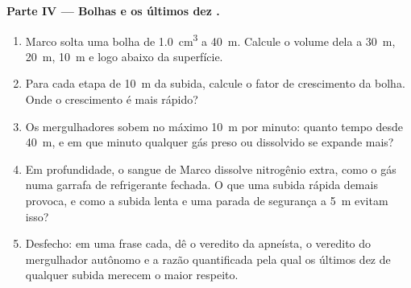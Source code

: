 \begin{problem}
\medskip
\noindent\textbf{Parte IV --- Bolhas e os últimos dez .}
\begin{enumerate}[resume]
  \item Marco solta uma bolha de \qty{1.0}{cm^3} a \qty{40}{m}. Calcule o
        volume dela a \qty{30}{m}, \qty{20}{m}, \qty{10}{m} e logo abaixo
        da superfície.
  \item Para cada etapa de \qty{10}{m} da subida, calcule o fator de
        crescimento da bolha. Onde o crescimento é mais rápido?
  \item Os mergulhadores sobem no máximo \qty{10}{m} por minuto: quanto
        tempo desde \qty{40}{m}, e em que minuto qualquer gás preso ou
        dissolvido se expande mais?
  \item Em profundidade, o sangue de Marco dissolve nitrogênio extra,
        como o gás numa garrafa de refrigerante fechada. O que uma subida
        rápida demais provoca, e como a subida lenta e uma parada de
        segurança a \qty{5}{m} evitam isso?
  \item Desfecho: em uma frase cada, dê o veredito da apneísta, o
        veredito do mergulhador autônomo e a razão quantificada pela qual
        os últimos dez  de qualquer subida merecem o maior
        respeito.
\end{enumerate}
\end{problem}
